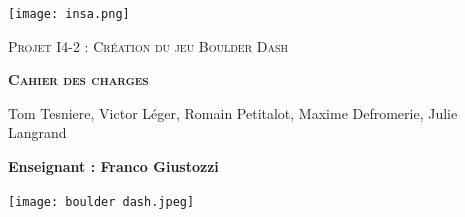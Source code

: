 \documentclass[french,a4paper,10pt]{article}
\begin{document}
\begin{titlepage}
\begin{sffamily}
\begin{center}

\texttt{[image: insa.png]}~\\[1.5cm]


 \vspace{0.8cm}
 
 \LARGE \textsc{Projet I4-2 : Création du jeu Boulder Dash}
 \vspace{0.7cm}
 

 
 \vspace{0.7cm}

\begin{center}
    \parbox{\textwidth}{ \Huge \centering \textbf{\textsc{Cahier des charges}}}
\end{center}
 
 \vspace{1cm}
 
\Large Tom Tesniere, Victor Léger, Romain Petitalot, Maxime Defromerie, Julie Langrand

\vspace{1cm}

 \textbf{Enseignant : Franco Giustozzi} 
 \vspace{0.5cm}
 
 \vspace{2.5cm}
 
\texttt{[image: boulder dash.jpeg]}~\\[1.5cm]



  \end{center}
  \end{sffamily}
\end{titlepage}


\tableofcontents
\newpage
\end{document}
